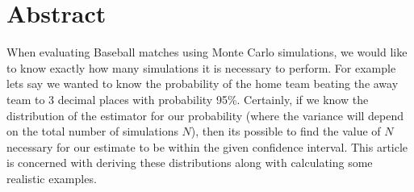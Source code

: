 \documentclass[
10pt, %
a4paper, %
oneside, %
headinclude,footinclude, %
BCOR5mm, %
]{scrartcl}
\title{\normalfont\spacedallcaps{How Many MC Simulations?}} %
\author{\spacedlowsmallcaps{Robert Wolstenholme}} %
\date{} %
\begin{document}

\renewcommand{\sectionmark}[1]{\markright{\spacedlowsmallcaps{#1}}} %
\lehead{\mbox{\llap{\small\thepage\kern1em\color{halfgray} \vline}\color{halfgray}\hspace{0.5em}\rightmark\hfil}} %

\pagestyle{scrheadings} %


\maketitle %

\setcounter{tocdepth}{2} %

\tableofcontents %

\listoffigures %

\listoftables %


\section*{Abstract} %

When evaluating Baseball matches using Monte Carlo simulations, we would like to know exactly how many simulations it is necessary to perform. For example lets say we wanted to know the probability of the home team beating the away team to 3 decimal places with probability 95\%. Certainly, if we know the distribution of the estimator for our probability (where the variance will depend on the total number of simulations $N$), then its possible to find the value of $N$ necessary for our estimate to be within the given confidence interval. This article is concerned with deriving these distributions along with calculating some realistic examples.
\end{document}
